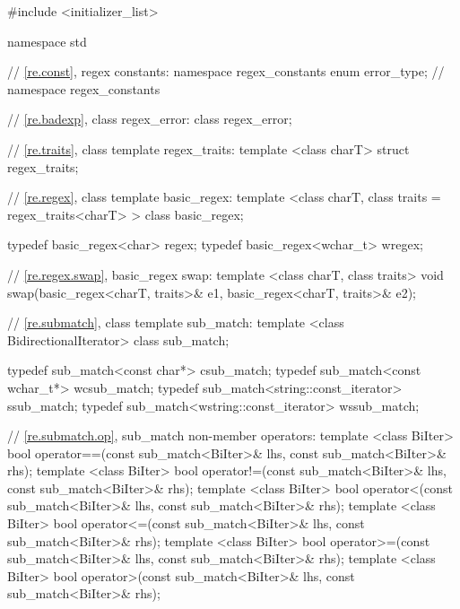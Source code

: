 %
%
%
%
\begin{codeblock}
#include <initializer_list>

namespace std {

  // \ref{re.const}, regex constants:
  namespace regex_constants {
    enum error_type;
  } // namespace regex_constants

  // \ref{re.badexp}, class regex_error:
  class regex_error;

  // \ref{re.traits}, class template regex_traits:
  template <class charT> struct regex_traits;

  // \ref{re.regex}, class template basic_regex:
  template <class charT, class traits = regex_traits<charT> > class basic_regex;

  typedef basic_regex<char>    regex;
  typedef basic_regex<wchar_t> wregex;

  // \ref{re.regex.swap}, basic_regex swap:
  template <class charT, class traits>
    void swap(basic_regex<charT, traits>& e1, basic_regex<charT, traits>& e2);

  // \ref{re.submatch}, class template sub_match:
  template <class BidirectionalIterator> 
    class sub_match;

  typedef sub_match<const char*>             csub_match;
  typedef sub_match<const wchar_t*>          wcsub_match;
  typedef sub_match<string::const_iterator>  ssub_match;
  typedef sub_match<wstring::const_iterator> wssub_match;

  // \ref{re.submatch.op}, sub_match non-member operators:
  template <class BiIter>
    bool operator==(const sub_match<BiIter>& lhs, const sub_match<BiIter>& rhs);
  template <class BiIter>
    bool operator!=(const sub_match<BiIter>& lhs, const sub_match<BiIter>& rhs);
  template <class BiIter>
    bool operator<(const sub_match<BiIter>& lhs, const sub_match<BiIter>& rhs);
  template <class BiIter>
    bool operator<=(const sub_match<BiIter>& lhs, const sub_match<BiIter>& rhs);
  template <class BiIter>
    bool operator>=(const sub_match<BiIter>& lhs, const sub_match<BiIter>& rhs);
  template <class BiIter>
    bool operator>(const sub_match<BiIter>& lhs, const sub_match<BiIter>& rhs);


}
\end{codeblock}
